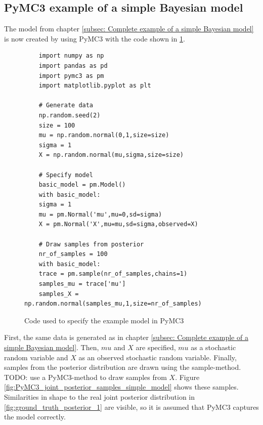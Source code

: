 \documentclass{article}
\begin{document}
\subsection{PyMC3 example of a simple Bayesian model}
\label{subsec: PyMC3 example of a simple Bayesian model}
The model from chapter \ref{subsec: Complete example of a simple Bayesian model} is now created by using PyMC3 with the code shown in \ref{fig:PyMC3_example_code_simple_model}.
\begin{figure}[h]
	\begin{lstlisting}
	import numpy as np
	import pandas as pd
	import pymc3 as pm
	import matplotlib.pyplot as plt
	
	# Generate data
	np.random.seed(2)
	size = 100
	mu = np.random.normal(0,1,size=size)
	sigma = 1
	X = np.random.normal(mu,sigma,size=size)
	
	# Specify model
	basic_model = pm.Model()
	with basic_model:
	sigma = 1
	mu = pm.Normal('mu',mu=0,sd=sigma)
	X = pm.Normal('X',mu=mu,sd=sigma,observed=X)
	
	# Draw samples from posterior
	nr_of_samples = 100
	with basic_model:
	trace = pm.sample(nr_of_samples,chains=1)
	samples_mu = trace['mu']
	samples_X = np.random.normal(samples_mu,1,size=nr_of_samples)
	\end{lstlisting}
	\caption[Code used to specify the example model in PyMC3]{Code used to specify the example model in PyMC3}
	\label{fig:PyMC3_example_code_simple_model}
\end{figure}
First, the same data is generated as in chapter \ref{subsec: Complete example of a simple Bayesian model}. Then, $mu$ and $X$ are specified, $mu$ as a stochastic random variable and $X$ as an observed stochastic random variable. Finally, samples from the posterior distribution are drawn using the sample-method. TODO: use a PyMC3-method to draw samples from $X$.
Figure \ref{fig:PyMC3_joint_posterior_samples_simple_model} shows these samples. Similarities in shape to the real joint posterior distribution in \ref{fig:ground_truth_posterior_1} are visible, so it is assumed that PyMC3 captures the model correctly.
\end{document}

